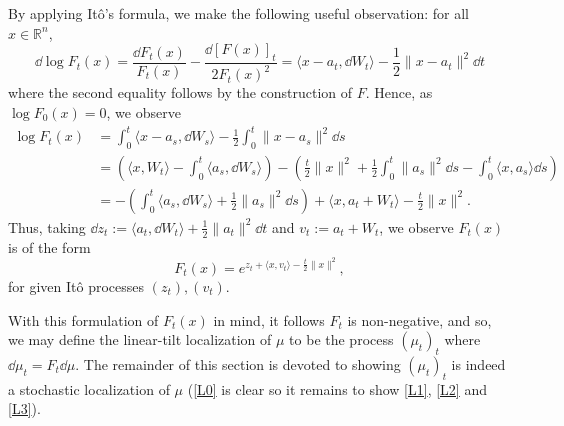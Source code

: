By applying Itô's formula, we make the following useful observation: for all \(x \in \mathbb{R}^n\),
\begin{equation}
  \dd \log F_t(x) = \frac{\dd F_t(x)}{F_t(x)} - \frac{\dd\hspace{0pt} [F(x)]_t}{2F_t(x)^2} 
    = \langle x - a_t, \dd W_t \rangle - \frac{1}{2}\|x - a_t\|^2 \dd t
\end{equation}
where the second equality follows by the construction of \(F\). Hence, as \(\log F_0(x) = 0\), we 
observe
\begin{align*}
  \log F_t(x) & = \int_0^t \langle x - a_s, \dd W_s \rangle - \frac{1}{2}\int_0^t \|x - a_s\|^2 \dd s\\
    & = \left(\langle x, W_t \rangle - \int_0^t \langle a_s, \dd W_s \rangle\right)
      - \left(\frac{t}{2}\|x\|^2 + \frac{1}{2}\int_0^t\|a_s\|^2 \dd s - \int_0^t \langle x, a_s \rangle \dd s\right)\\
    & = - \left(\int_0^t \langle a_s, \dd W_s \rangle + \frac{1}{2}\|a_s\|^2 \dd s\right) + 
      \langle x, a_t + W_t \rangle - \frac{t}{2}\|x\|^2.
\end{align*}
Thus, taking \(\dd z_t := \langle a_t, \dd W_t\rangle + \frac{1}{2} \|a_t\|^2 \dd t\) and 
\(v_t := a_t + W_t\), we observe \(F_t(x)\) is of the form
\begin{equation}\label{eq:stoch_loc_alt}
  F_t(x) = e^{z_t + \langle x, v_t \rangle - \frac{t}{2}\|x\|^2},
\end{equation}
for given Itô processes \((z_t), (v_t)\).

With this formulation of \(F_t(x)\) in mind, it follows \(F_t\) is non-negative, and so, 
we may define the linear-tilt localization of \(\mu\) to be the process \((\mu_t)_t\) 
where \(\dd \mu_t = F_t \dd \mu\). The remainder of this section is devoted to showing \((\mu_t)_t\) is 
indeed a stochastic localization of \(\mu\) (\ref{L0} is clear so it remains to show \ref{L1}, \ref{L2} and \ref{L3}).

